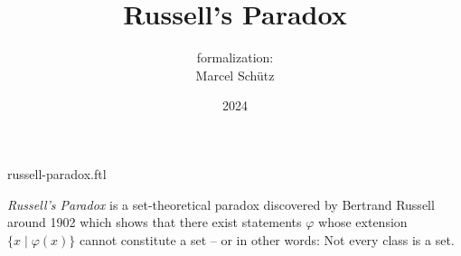 \documentclass{article}
\title{Russell's Paradox}
\author{\Naproche formalization:\\[0.5em]Marcel Schütz}
\date{2024}
\begin{document}
\begin{smodule}{russell-paradox.ftl}
  \maketitle
  \hidetlsnumbers

  \noindent \emph{Russell's Paradox} is a set-theoretical paradox discovered by
  Bertrand Russell around 1902 \cite[chapter XV]{Frege1980} which shows that 
  there exist statements $\varphi$ whose extension
  $\{x\mid\varphi(x)\}$ cannot constitute a set -- or in other words:
  Not every class is a set.


  \printbibliography
\end{smodule}
\end{document}
